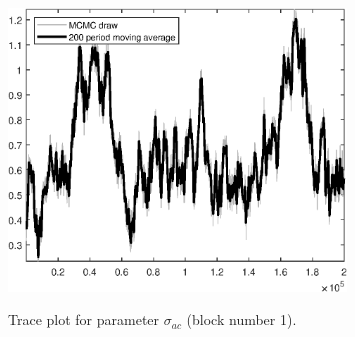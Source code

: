 \begin{figure}[H]
\centering
  \includegraphics[width=0.8\textwidth]{BRS_sectoral_rest/graphs/TracePlot_sigma_ac_blck_1}\\
    \caption{Trace plot for parameter ${\sigma_{ac}}$ (block number 1).}
\end{figure}
